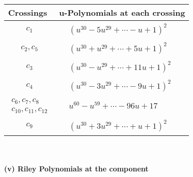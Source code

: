 \documentclass[1p]{elsarticle_modified}
\theoremstyle{definition}
\begin{document}
\begin{tabular}{m{50pt}|m{274pt}}
Crossings & \hspace{64pt}u-Polynomials at each crossing \\
\hline $$\begin{aligned}c_{1}\end{aligned}$$&$\begin{aligned}
&(u^{30}-5 u^{29}+\cdots- u+1)^{2}
\end{aligned}$\\
\hline $$\begin{aligned}c_{2},c_{5}\end{aligned}$$&$\begin{aligned}
&(u^{30}+u^{29}+\cdots+5 u+1)^{2}
\end{aligned}$\\
\hline $$\begin{aligned}c_{3}\end{aligned}$$&$\begin{aligned}
&(u^{30}- u^{29}+\cdots+11 u+1)^{2}
\end{aligned}$\\
\hline $$\begin{aligned}c_{4}\end{aligned}$$&$\begin{aligned}
&(u^{30}-3 u^{29}+\cdots-9 u+1)^{2}
\end{aligned}$\\
\hline $$\begin{aligned}c_{6},c_{7},c_{8}\\c_{10},c_{11},c_{12}\end{aligned}$$&$\begin{aligned}
&u^{60}- u^{59}+\cdots-96 u+17
\end{aligned}$\\
\hline $$\begin{aligned}c_{9}\end{aligned}$$&$\begin{aligned}
&(u^{30}+3 u^{29}+\cdots+u+1)^{2}
\end{aligned}$\\
\hline
\end{tabular}\\~\\
\newpage\renewcommand{\arraystretch}{1}
\flushleft \textbf{(v) Riley Polynomials at the component}\newline \\
\end{document}

